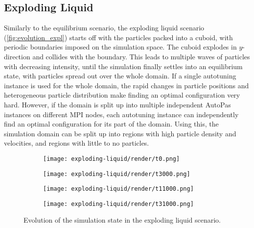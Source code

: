 \subsection{Exploding Liquid}
Similarly to the equilibrium scenario, the exploding liquid scenario (\autoref{fig:evolution_expl}) starts off with the particles packed into a cuboid, with periodic boundaries imposed on the simulation space. The cuboid explodes in $y$-direction and collides with the boundary. This leads to multiple waves of particles with decreasing intensity, until the simulation finally settles into an equilibrium state, with particles spread out over the whole domain. If a single autotuning instance is used for the whole domain, the rapid changes in particle positions and heterogeneous particle distribution make finding an optimal configuration very hard. However, if the domain is split up into multiple independent AutoPas instances on different MPI nodes, each autotuning instance can independently find an optimal configuration for its part of the domain. Using this, the simulation domain can be split up into regions with high particle density and velocities, and regions with little to no particles.

\label{subsec:expl}
\begin{figure}[htpb]
	\centering
	\begin{subfigure}[c]{.25\textwidth}
		\vspace*{-\ht\colorbarbox} %
		\texttt{[image: exploding-liquid/render/t0.png]}
	\end{subfigure}%
	\begin{subfigure}[c]{.25\textwidth}
		\texttt{[image: exploding-liquid/render/t3000.png]}
	\end{subfigure}%
	\begin{subfigure}[c]{.25\textwidth}
		\centering
		\texttt{[image: exploding-liquid/render/t11000.png]}
	\end{subfigure}%
	\begin{subfigure}[c]{.25\textwidth}
		\centering
		\texttt{[image: exploding-liquid/render/t31000.png]}
	\end{subfigure}
	\caption{Evolution of the simulation state in the exploding liquid scenario.}
	\label{fig:evolution_expl}
\end{figure}

